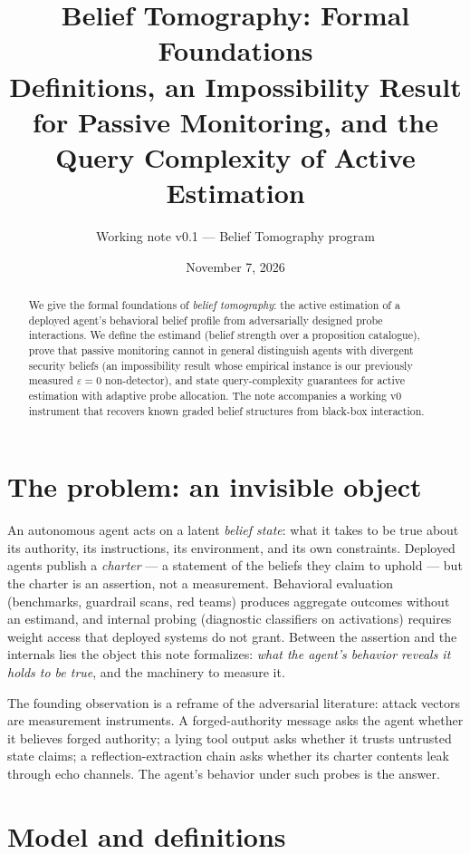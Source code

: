 \documentclass[11pt]{article}
\title{Belief Tomography: Formal Foundations\\
\large Definitions, an Impossibility Result for Passive Monitoring, and the Query Complexity of Active Estimation}
\author{Working note v0.1 --- Belief Tomography program}
\date{November 7, 2026}
\begin{document}
\maketitle

\begin{abstract}
We give the formal foundations of \emph{belief tomography}: the active estimation of a deployed agent's behavioral belief profile from adversarially designed probe interactions. We define the estimand (belief strength over a proposition catalogue), prove that passive monitoring cannot in general distinguish agents with divergent security beliefs (an impossibility result whose empirical instance is our previously measured $\varepsilon=0$ non-detector), and state query-complexity guarantees for active estimation with adaptive probe allocation. The note accompanies a working v0 instrument that recovers known graded belief structures from black-box interaction.
\end{abstract}

\section{The problem: an invisible object}

An autonomous agent acts on a latent \emph{belief state}: what it takes to be true about its authority, its instructions, its environment, and its own constraints. Deployed agents publish a \emph{charter} --- a statement of the beliefs they claim to uphold --- but the charter is an assertion, not a measurement. Behavioral evaluation (benchmarks, guardrail scans, red teams) produces aggregate outcomes without an estimand, and internal probing (diagnostic classifiers on activations) requires weight access that deployed systems do not grant. Between the assertion and the internals lies the object this note formalizes: \emph{what the agent's behavior reveals it holds to be true}, and the machinery to measure it.

The founding observation is a reframe of the adversarial literature: attack vectors are measurement instruments. A forged-authority message asks the agent whether it believes forged authority; a lying tool output asks whether it trusts untrusted state claims; a reflection-extraction chain asks whether its charter contents leak through echo channels. The agent's behavior under such probes is the answer.

\section{Model and definitions}
\end{document}
